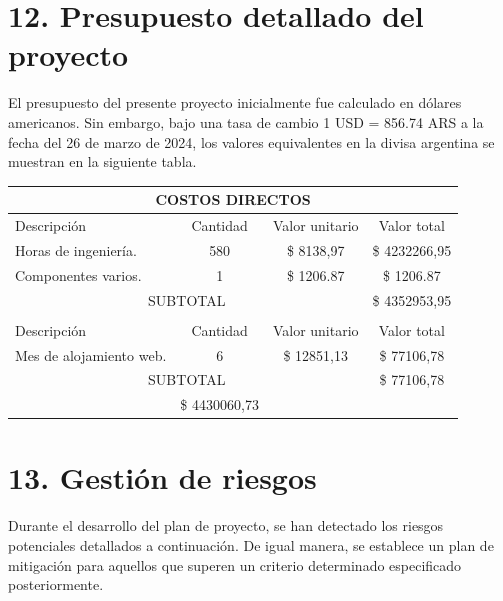 \documentclass[
11pt, %
codirector, %
]{charter}
\begin{document}
\section{12. Presupuesto detallado del proyecto}
\label{sec:presupuesto}

El presupuesto del presente proyecto inicialmente fue calculado en dólares americanos. Sin embargo, bajo una tasa de cambio 1 USD = 856.74 ARS a la fecha del 26 de marzo de 2024, los valores equivalentes en la divisa argentina se muestran en la siguiente tabla.
\begin{table}[htpb]
\centering
\begin{tabularx}{\linewidth}{@{}|X|c|r|r|@{}}
\hline
\multicolumn{4}{|c|}{\cellcolor[HTML]{C0C0C0}COSTOS DIRECTOS} \\ \hline
\rowcolor[HTML]{C0C0C0} 
Descripción &
  \multicolumn{1}{c|}{\cellcolor[HTML]{C0C0C0}Cantidad} &
  \multicolumn{1}{c|}{\cellcolor[HTML]{C0C0C0}Valor unitario} &
  \multicolumn{1}{c|}{\cellcolor[HTML]{C0C0C0}Valor total} \\ \hline
 Horas de ingeniería. &
  \multicolumn{1}{c|}{580} &
  \multicolumn{1}{c|}{\$ 8138,97} &
  \multicolumn{1}{c|}{\$ 4232266,95} \\ \hline
 Componentes varios. &
  \multicolumn{1}{c|}{1} &
  \multicolumn{1}{c|}{\$ 1206.87} &
  \multicolumn{1}{c|}{\$ 1206.87} \\ \hline
\multicolumn{3}{|c|}{SUBTOTAL} &
  \multicolumn{1}{c|}{\$ 4352953,95} \\ \hline
\rowcolor[HTML]{C0C0C0} 
\multicolumn{4}{|c|}{\cellcolor[HTML]{C0C0C0}COSTOS INDIRECTOS} \\ \hline
\rowcolor[HTML]{C0C0C0} 
Descripción &
  \multicolumn{1}{c|}{\cellcolor[HTML]{C0C0C0}Cantidad} &
  \multicolumn{1}{c|}{\cellcolor[HTML]{C0C0C0}Valor unitario} &
  \multicolumn{1}{c|}{\cellcolor[HTML]{C0C0C0}Valor total} \\ \hline
Mes de alojamiento web. &
  \multicolumn{1}{c|}{6} &
  \multicolumn{1}{c|}{\$ 12851,13} &
  \multicolumn{1}{c|}{\$ 77106,78} \\ \hline
\multicolumn{3}{|c|}{SUBTOTAL} &
  \multicolumn{1}{c|}{\$ 77106,78} \\ \hline
\rowcolor[HTML]{C0C0C0}
\multicolumn{3}{|c|}{TOTAL} & \$ 4430060,73
   \\ \hline
\end{tabularx}%
\end{table}


\section{13. Gestión de riesgos}
\label{sec:riesgos}
Durante el desarrollo del plan de proyecto, se han detectado los riesgos potenciales detallados a continuación. De igual manera, se establece un plan de mitigación para aquellos que superen un criterio determinado especificado posteriormente.
\end{document}
